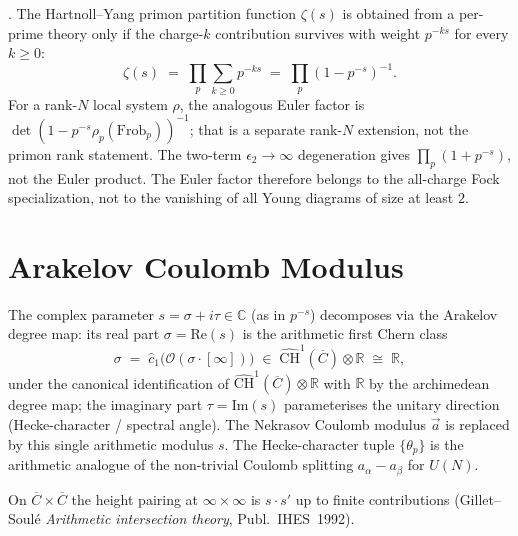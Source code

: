 \begin{theorem}
\label{v4-arith:thm:primon-as-degenerate-nekrasov}
\ClaimStatusConjectured. The Hartnoll--Yang primon partition
function \(\zeta(s)\) is obtained from a per-prime theory only if the
charge-\(k\) contribution survives with weight \(p^{-ks}\) for every
\(k\geq0\):
\begin{equation}
\boxed{\;\zeta(s)\;=\;\prod_{p}\sum_{k\geq0}p^{-ks}
\;=\;\prod_{p}(1-p^{-s})^{-1}.\;}
\end{equation}
For a rank-\(N\) local system \(\rho\), the analogous Euler factor is
\(\det(1-p^{-s}\rho_{p}(\mathrm{Frob}_{p}))^{-1}\); that is a separate
rank-\(N\) extension, not the primon rank statement.
The two-term \(\epsilon_{2}\to\infty\) degeneration gives
\(\prod_{p}(1+p^{-s})\), not the Euler product. The Euler factor
therefore belongs to the all-charge Fock specialization, not to the
vanishing of all Young diagrams of size at least \(2\).
\end{theorem}

\section{Arakelov Coulomb Modulus}
\label{v4-arith:nk:Arakelov-Coulomb}

\begin{definition}
\label{v4-arith:def:arithmetic-coulomb}
The complex parameter \(s=\sigma+i\tau\in\mathbb{C}\) (as in
\(p^{-s}\)) decomposes via the Arakelov degree map: its real part
\(\sigma=\mathrm{Re}(s)\) is the arithmetic first Chern class
\begin{equation}
\sigma\;=\;\widehat{c}_{1}\bigl(\mathcal{O}(\sigma\cdot[\infty])\bigr)\;\in\;\widehat{\mathrm{CH}}^{1}(\overline{C})\otimes\mathbb{R}\;\cong\;\mathbb{R},
\end{equation}
under the canonical identification of \(\widehat{\mathrm{CH}}^{1}(\overline{C})\otimes\mathbb{R}\)
with \(\mathbb{R}\) by the archimedean degree map; the imaginary
part \(\tau=\mathrm{Im}(s)\) parameterises the unitary direction
(Hecke-character / spectral angle).
The Nekrasov Coulomb modulus \(\vec a\) is replaced by this single
arithmetic modulus \(s\). The Hecke-character tuple \(\{\theta_{p}\}\)
is the arithmetic analogue of the non-trivial Coulomb splitting
\(a_{\alpha}-a_{\beta}\) for \(U(N)\).
\end{definition}

\begin{remark}
On \(\overline{C}\times\overline{C}\) the height pairing at
\(\infty\times\infty\) is \(s\cdot s'\) up to finite contributions
(Gillet--Soulé \emph{Arithmetic intersection theory},
Publ.~IHES~1992).
\end{remark}

